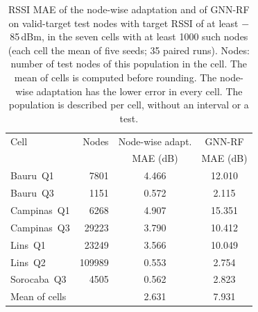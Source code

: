 \begin{table}[!t]
\centering
\caption{RSSI MAE of the node-wise adaptation and of GNN-RF on valid-target test nodes with target RSSI of at least $-$85\,dBm, in the seven cells with at least \num{1000} such nodes (each cell the mean of five seeds; 35 paired runs). Nodes: number of test nodes of this population in the cell. The mean of cells is computed before rounding. The node-wise adaptation has the lower error in every cell. The population is described per cell, without an interval or a test.}
\label{tab:cov85_ba1}
\setlength{\tabcolsep}{4pt}
\begin{tabular}{lrcc}
\toprule
Cell & Nodes & Node-wise adapt. & GNN-RF \\
 & & MAE (dB) & MAE (dB) \\
\midrule
Bauru~Q1 & \num{7801} & 4.466 & 12.010 \\
Bauru~Q3 & \num{1151} & 0.572 & 2.115 \\
Campinas~Q1 & \num{6268} & 4.907 & 15.351 \\
Campinas~Q3 & \num{29223} & 3.790 & 10.412 \\
Lins~Q1 & \num{23249} & 3.566 & 10.049 \\
Lins~Q2 & \num{109989} & 0.553 & 2.754 \\
Sorocaba~Q3 & \num{4505} & 0.562 & 2.823 \\
\midrule
Mean of cells & & 2.631 & 7.931 \\
\bottomrule
\end{tabular}
\end{table}

